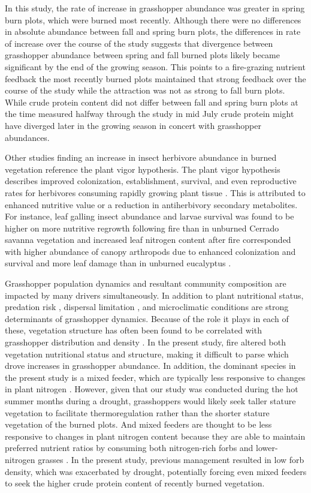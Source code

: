 \documentclass[referee, 
	            sn-basic]
           {sn-jnl}
\begin{document}
In this study, the rate of increase in grasshopper abundance was greater in spring burn plots, which were burned most recently. Although there were no differences in absolute abundance between fall and spring burn plots, the differences in rate of increase over the course of the study suggests that divergence between grasshopper abundance between spring and fall burned plots likely became significant by the end of the growing season. This points to a fire-grazing nutrient feedback \textemdash the most recently burned plots maintained that strong feedback over the course of the study while the attraction was not as strong to fall burn plots. While crude protein content did not differ between fall and spring burn plots at the time measured \textemdash halfway through the study in mid July \textemdash crude protein might have diverged later in the growing season in concert with grasshopper abundances. 

Other studies finding an increase in insect herbivore abundance in burned vegetation reference the plant vigor hypothesis. The plant vigor hypothesis describes improved colonization, establishment, survival, and even reproductive rates for herbivores consuming rapidly growing plant tissue \citep{price1991}. This is attributed to enhanced nutritive value or a reduction in antiherbivory secondary metabolites. For instance, leaf galling insect abundance and larvae survival was found to be higher on more nutritive regrowth following fire than in unburned Cerrado savanna vegetation \citep{vieira1996} and increased leaf nitrogen content after fire corresponded with higher abundance of canopy arthropods due to enhanced colonization and survival and more leaf damage than in unburned eucalyptus \citep{radhotoly2001}. 

Grasshopper population dynamics and resultant community composition are impacted by many drivers simultaneously. In addition to plant nutritional status, predation risk \citep{schmitz1997}, dispersal limitation \citep{hawlena2010}, and microclimatic conditions \citep{bauer2007, gardiner2008} are strong determinants of grasshopper dynamics. Because of the role it plays in each of these, vegetation structure has often been found to be correlated with grasshopper distribution and density \citep{joern2004}. In the present study, fire altered both vegetation nutritional status and structure, making it difficult to parse which drove increases in grasshopper abundance. In addition, the dominant species in the present study is a mixed feeder, which are typically less responsive to changes in plant nitrogen \citep{joern2012, jonas2008}. However, given that our study was conducted during the hot summer months during a drought, grasshoppers would likely seek taller stature vegetation to facilitate thermoregulation rather than the shorter stature vegetation of the burned plots. And mixed feeders are thought to be less responsive to changes in plant nitrogen content because they are able to maintain preferred nutrient ratios by consuming both nitrogen-rich forbs and lower-nitrogen grasses \citep{jonas2008}. In the present study, previous management resulted in low forb density, which was exacerbated by drought, potentially forcing even mixed feeders to seek the higher crude protein content of recently burned vegetation. 
\end{document}
